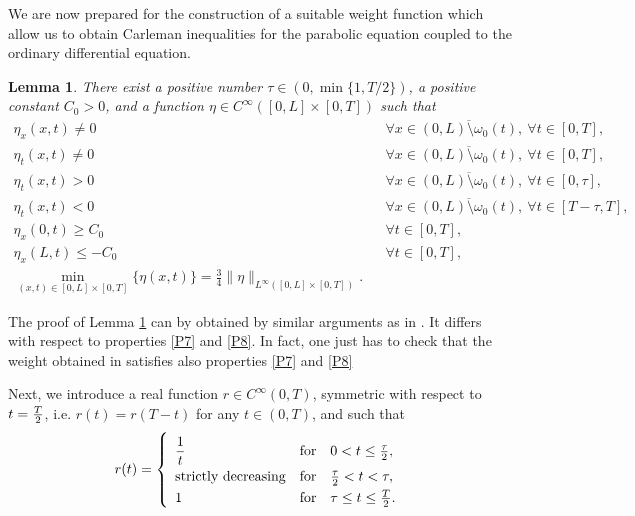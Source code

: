 \documentclass[10pt]{article}
\newtheorem{lemma}{Lemma}
\def\dis{\displaystyle}
\def\om{\omega}
\def\\Phivec{\mathbf{\Phi}}
\newcommand{\ba}{\begin{eqnarray}}
\newcommand{\ea}{\end{eqnarray}}
\begin{document}
    We are now prepared for the  construction of  a suitable weight function { which allow us to obtain Carleman inequalities
    for the parabolic equation coupled to the ordinary differential equation.}
\begin{lemma}\label{weight}
   There exist a positive number $\tau \in (0,\min\{1,T/2\})$, a positive
    constant $C_0>0$, and a function $\eta \in C^\infty ( [0,L]\times [0,T])$ such that
\ba
    \eta_x(x,t) \ne 0
    &&\forall x\in \overline{(0,L)\setminus\om_0(t)},\ \forall t\in[0,T],        \label{P1}\\
    \eta_t (x,t) \ne 0
    &&\forall x\in \overline{(0,L)\setminus\om_0(t)},\ \forall t\in[0,T],          \label{P2}\\
    \eta_t (x,t)  >0
    &&\forall x\in \overline{(0,L)\setminus\om_0(t)},\ \forall t\in[0,\tau],        \label{P3}\\
    \eta_t  (x,t) <0
    &&\forall x\in \overline{(0,L)\setminus\om_0(t)},\ \forall t\in[T-\tau,T],    \label{P4}\\
    \eta_x(0,t) \geq C_0
    &&\forall t\in [0,T ],     \label{P7}\\
    \eta_x(L,t)\leq-C_0
    &&\forall t\in [0,T ],     \label{P8}\\
    \min\limits_{(x,t)\in[0,L]\times [0,T]}\{\eta (x,t)\} =\frac{3}{4}\|\eta \|_{L^\infty([0,L]\times [0,T])}.&&
                            \label{P5}
\ea
\end{lemma}
    The proof of Lemma \ref{weight} can by obtained by similar arguments as in  \cite[Appendix $A$]{CSZR}.
    It differs with respect to properties \eqref{P7} and \eqref{P8}. { In fact, one just has to check that
    the weight obtained in \cite[Appendix $A$]{CSZR} satisfies also properties \eqref{P7} and \eqref{P8}}

    Next, we introduce a real function  $r\in C^\infty(0,T)$, symmetric with respect to $t={T\over2}$, i.e.
    $r(t)=r(T-t)$ for any $t\in(0,T)$, and such that%
\begin{equation}\label{eq:r}
    r(t) = \left\{
    \begin{array}{lcl}
    \noalign{\smallskip}\dis
    {1\over t} &\text{for}& 0<t\leq{\tau\over2}, \\
    \noalign{\smallskip}\dis
    \text{\rm strictly decreasing}&\text{for}& {\tau\over2}< t <\tau,\\
    \noalign{\smallskip}\dis
    1    &\text{for}&\tau \le t \le {T\over2}.
    \end{array}
    \right.
\end{equation}
\end{document}
